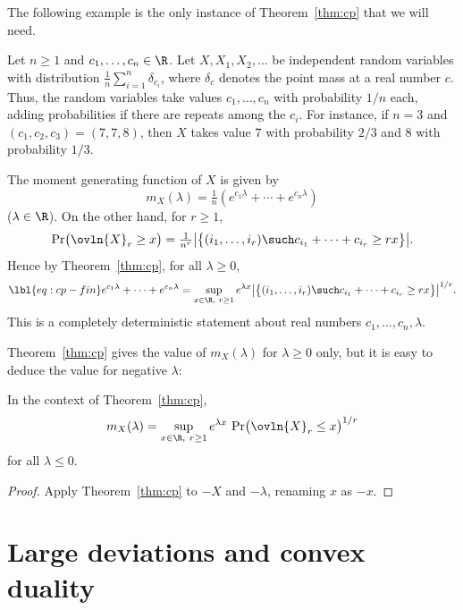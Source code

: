 The following example is the only instance of Theorem~\ref{thm:cp} that we
will need. 


\begin{example}
Let $n \geq 1$ and $c_1, \ldots, c_n \in \R$.  Let $X, X_1, X_2, \ldots$ be
independent random variables with distribution $\tfrac{1}{n} \sum_{i = 1}^n
\delta_{c_i}$, where $\delta_c$ denotes the point mass at a real number
$c$. Thus, the random variables take values $c_1, \ldots, c_n$ with
probability $1/n$ each, adding probabilities if there are repeats among the
$c_i$.  For instance, if $n = 3$ and $(c_1, c_2, c_3) = (7, 7, 8)$, then
$X$ takes value $7$ with probability $2/3$ and $8$ with probability $1/3$.

The moment generating function of $X$ is given by
\[
m_X(\lambda)
=
\tfrac{1}{n}(e^{c_1 \lambda} + \cdots + e^{c_n \lambda})
\]
($\lambda \in \R$).  On the other hand, for $r \geq 1$,
\[
\Pr\bigl(\ovln{X}_r \geq x\bigr) 
=
\tfrac{1}{n^r} 
\bigl|\bigl\{
(i_1, \ldots, i_r) \such c_{i_1} + \cdots + c_{i_r} \geq rx
\bigr\}\bigr|.
\]
Hence by Theorem~\ref{thm:cp}, for all $\lambda \geq 0$, 
% 
\begin{equation}
\lbl{eq:cp-fin}
e^{c_1\lambda} + \cdots + e^{c_n\lambda}
=
\sup_{x \in \R, \ r \geq 1}
e^{\lambda x} 
\bigl|\bigl\{
(i_1, \ldots, i_r) \such c_{i_1} + \cdots + c_{i_r} \geq rx
\bigr\}\bigr|^{1/r}.
\end{equation}
% 
This is a completely deterministic statement about real numbers $c_1,
\ldots, c_n, \lambda$.
\end{example}

Theorem~\ref{thm:cp} gives the value of $m_X(\lambda)$ for $\lambda \geq 0$
only, but it is easy to deduce the value for negative $\lambda$:

\begin{cor}
In the context of Theorem~\ref{thm:cp},
\[
m_X(\lambda)
=
\sup_{x \in \R, \ r \geq 1} 
e^{\lambda x} \, \Pr\bigl(\ovln{X}_r \leq x\bigr)^{1/r}
\]
for all $\lambda \leq 0$.
\end{cor}

\begin{proof}
Apply Theorem~\ref{thm:cp} to $-X$ and $-\lambda$, renaming $x$ as $-x$.
\end{proof}


\section{Large deviations and convex duality}

